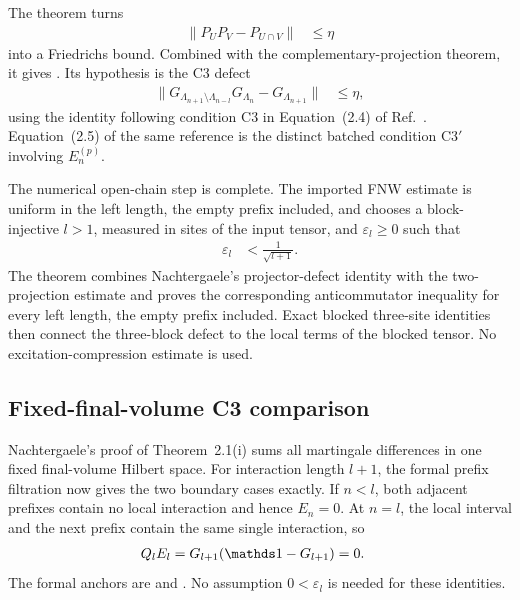 \documentclass{article}
\begin{document}
The theorem
turns
\begin{align}
    \lVert P_UP_V-P_{U\cap V}\rVert
     & \leq\eta
    \label{eq:cpgsv21_martingale_overlap_friedrichs_projector_bound}
\end{align}
into a Friedrichs bound. Combined with the complementary-projection theorem,
it gives
.
Its hypothesis is the C3 defect
\begin{align}
    \lVert
    G_{\Lambda_{n+1}\setminus\Lambda_{n-l}}G_{\Lambda_n}
    -G_{\Lambda_{n+1}}
    \rVert
     & \leq\eta,
    \label{eq:cpgsv21_martingale_overlap_open_chain_c3_defect}
\end{align}
using the identity following condition C3 in Equation~(2.4) of
Ref.~\cite{Nachtergaele1996Spectral}. Equation~(2.5) of the same reference is
the distinct batched condition C3$'$ involving $E_n^{(p)}$.

The numerical open-chain step is complete. The imported FNW estimate is
uniform in the left length, the empty prefix included, and
chooses a block-injective $l>1$, measured in sites of the input tensor, and
$\varepsilon_l\geq0$ such that
\begin{align}
    \varepsilon_l
     & <\frac{1}{\sqrt{l+1}}.
    \label{eq:cpgsv21_martingale_overlap_c3_threshold}
\end{align}
The theorem
combines Nachtergaele's projector-defect identity with the two-projection
estimate and proves the corresponding anticommutator inequality for every left
length, the empty prefix included. Exact blocked three-site identities then
connect the three-block defect to the local terms of the blocked tensor. No
excitation-compression estimate is used.

\subsection{Fixed-final-volume C3 comparison}

Nachtergaele's proof of Theorem~2.1(i) sums all martingale differences in one
fixed final-volume Hilbert space.  For interaction length $l+1$, the formal
prefix filtration now gives the two boundary cases exactly.  If $n<l$, both
adjacent prefixes contain no local interaction and hence $E_n=0$.  At $n=l$,
the local interval and the next prefix contain the same single interaction, so
\begin{align}
    Q_lE_l
     & =G_{l+1}(\Id-G_{l+1})=0.
    \label{eq:cpgsv21_martingale_overlap_fixed_volume_endpoint}
\end{align}
The formal anchors are
 and
.
No assumption $0<\varepsilon_l$ is needed for these identities.
\end{document}
